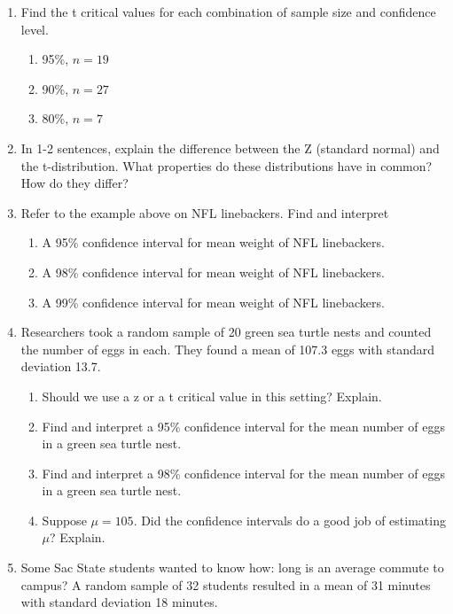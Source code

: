 \documentclass[
]{book}
\providecommand{\tightlist}{%
  \setlength{\itemsep}{0pt}\setlength{\parskip}{0pt}}
\begin{document}
\begin{enumerate}
\def\labelenumi{\arabic{enumi}.}
\tightlist
\item
  Find the t critical values for each combination of sample size and confidence level.

  \begin{enumerate}
  \def\labelenumii{\alph{enumii}.}
  \tightlist
  \item
    95\%, \(n=19\)
  \item
    90\%, \(n=27\)
  \item
    80\%, \(n=7\)
  \end{enumerate}
\item
  In 1-2 sentences, explain the difference between the Z (standard normal) and the t-distribution. What properties do these distributions have in common? How do they differ?
\item
  Refer to the example above on NFL linebackers. Find and interpret

  \begin{enumerate}
  \def\labelenumii{\alph{enumii}.}
  \tightlist
  \item
    A 95\% confidence interval for mean weight of NFL linebackers.
  \item
    A 98\% confidence interval for mean weight of NFL linebackers.
  \item
    A 99\% confidence interval for mean weight of NFL linebackers.
  \end{enumerate}
\item
  Researchers took a random sample of 20 green sea turtle nests and counted the number of eggs in each. They found a mean of 107.3 eggs with standard deviation 13.7.

  \begin{enumerate}
  \def\labelenumii{\alph{enumii}.}
  \tightlist
  \item
    Should we use a z or a t critical value in this setting? Explain.
  \item
    Find and interpret a 95\% confidence interval for the mean number of eggs in a green sea turtle nest.
  \item
    Find and interpret a 98\% confidence interval for the mean number of eggs in a green sea turtle nest.
  \item
    Suppose \(\mu = 105\). Did the confidence intervals do a good job of estimating \(\mu\)? Explain.
  \end{enumerate}
\item
  Some Sac State students wanted to know how: long is an average commute to campus? A random sample of 32 students resulted in a mean of 31 minutes with standard deviation 18 minutes.


\end{enumerate}
\end{document}
